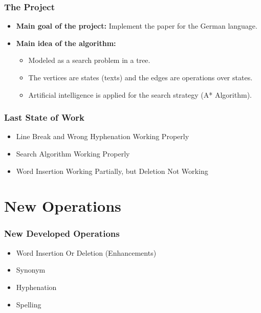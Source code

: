 \documentclass{beamer}
\begin{document}
\begin{frame}
\frametitle{The Project}
\begin{itemize}
\item \textbf{Main goal of the project:} Implement the paper for the German language.
\item \textbf{Main idea of the algorithm:}
	\begin{itemize}
	\item Modeled as a search problem in a tree.
	\item The vertices are states (texts) and the edges are operations over states.
	\item Artificial intelligence is applied for the search strategy (A* Algorithm).
	\end{itemize}
\end{itemize}
\end{frame}

\begin{frame}
\frametitle{Last State of Work}
\begin{itemize}
\item Line Break and Wrong Hyphenation Working Properly
\item Search Algorithm Working Properly
\item Word Insertion Working Partially, but Deletion Not Working
\end{itemize}
\end{frame}

\section{New Operations}
\begin{frame}
\frametitle{New Developed Operations}
\begin{itemize}
	\item Word Insertion Or Deletion (Enhancements)
	\item Synonym
	\item Hyphenation
	\item Spelling
\end{itemize}
\end{frame}
\end{document}
